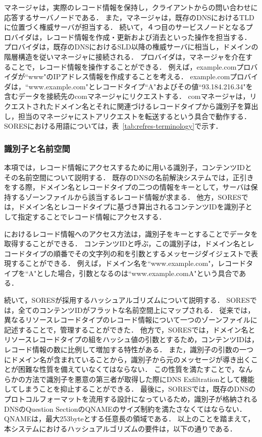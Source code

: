 マネージャは，実際のレコード情報を保持し，クライアントからの問い合わせに応答するサーバノードである．
また，マネージャは，既存のDNSにおけるTLDに位置づく権威サーバが担当する．
続いて，４つ目のサービスノードとなるプロバイダは，レコード情報を作成・更新および消去といった操作を担当する．
プロバイダは，既存のDNSにおけるSLD以降の権威サーバに相当し，ドメインの階層構造を従いマネージャに接続される．
プロバイダは，マネージャを介在することで，レコード情報を操作することができる．
例えば，example.comプロバイダが``www"のIPアドレス情報を作成することを考える．
example.comプロバイダは，``www.example.com"とレコードタイプ``A"およびその値``93.184.216.34"を含むデータを接続先のcomマネージャにリクエストする．
comマネージャは，リクエストされたドメイン名とそれに関連づけるレコードタイプから識別子を算出し，担当のマネージャにストアリクエストを転送するという具合で動作する．
SORESにおける用語については，表~\ref{tab:refres-terminology}で示す．


\subsubsection{識別子と名前空間}
本項では，レコード情報にアクセスするために用いる識別子，コンテンツIDとその名前空間について説明する．
既存のDNSの名前解決システムでは，正引きをする際，ドメイン名とレコードタイプの二つの情報をキーとして，サーバは保持するゾーンファイルから該当するレコード情報が求まる．
他方，SORESでは，ドメイン名とレコードタイプに基づき算出されるコンテンツIDを識別子として指定することでレコード情報にアクセスする．

におけるレコード情報へのアクセス方法は，識別子をキーとすることでデータを取得することができる．
コンテンツIDと呼ぶ，この識別子は，ドメイン名とレコードタイプの順番でその文字列の和を引数とするメッセージダイジェストで表現することができる．
例えば，ドメイン名を``www.example.com"，レコードタイプを``A"とした場合，引数となるのは``www.example.comA"という具合である．

続いて，SORESが採用するハッシュアルゴリズムについて説明する．
SORESでは，全てのコンテンツIDがフラットな名前空間上にマップされる．
従来では，異なるリソースレコードタイプのレコード情報について一つのゾーンファイルに記述することで，管理することができた．
他方で，SORESでは，ドメイン名とリソースレコードタイプの組をハッシュ値の引数とするため，コンテンツIDは，レコード情報の数に比例して増加する特性がある．
また，識別子の引数の一つにドメイン名が含まれていることから，識別子から元のメッセージが導き出くことが困難な性質を備えていなくてはならない．
この性質を満たすことで，なんらかの方法で識別子を悪意の第三者が取得した際にDNS Exfiltrationとして機能してしまうことを抑止することができる．
最後に，SORESでは，既存のDNSのプロトコルフォーマットを流用する設計になっているため，識別子が格納されるDNSのQuestion SectionのQNAMEのサイズ制約を満たさなくてはならない．
QNAMEは，最大253byteとする任意長の領域である．
以上のことを踏まえて，本システムにおけるハッシュアルゴリズムの要件は，以下の通りである．

